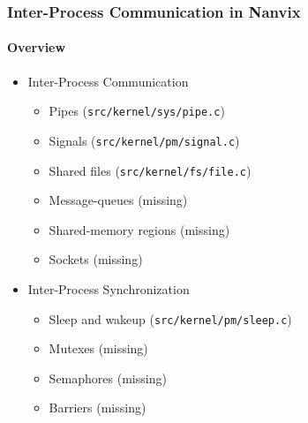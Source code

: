 \documentclass{beamer}
\begin{document}
	\begin{frame}
	\frametitle{Inter-Process Communication in Nanvix}
	\framesubtitle{Overview}
		\begin{itemize}
		\setlength\itemsep{0.8em}
			\item Inter-Process Communication
			\begin{itemize}
			\setlength\itemsep{0.2em}
				\item Pipes (\texttt{src/kernel/sys/pipe.c})
				\item Signals (\texttt{src/kernel/pm/signal.c})
				\item Shared files (\texttt{src/kernel/fs/file.c})
				\item Message-queues (missing)
				\item Shared-memory regions  (missing)
				\item Sockets (missing)
			\end{itemize}

			\item Inter-Process Synchronization
			\begin{itemize}
			\setlength\itemsep{0.2em}
				\item Sleep and wakeup (\texttt{src/kernel/pm/sleep.c})
				\item Mutexes (missing)
				\item Semaphores (missing)
				\item Barriers (missing)
			\end{itemize}
		\end{itemize}
	\end{frame}
\end{document}
